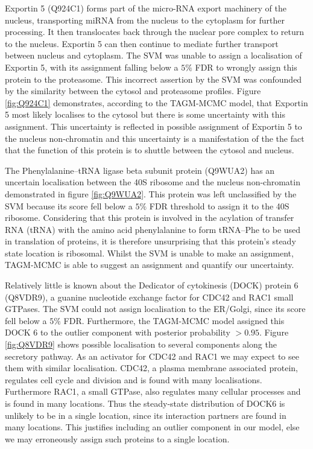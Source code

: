 \documentclass[12pt,english]{article}\usepackage[]{graphicx}\usepackage[]{color}
\begin{document}
\bigskip

Exportin 5 (Q924C1) forms part of the micro-RNA export machinery of
the nucleus, transporting miRNA from the nucleus to the cytoplasm for
further processing.  It then translocates back through the nuclear
pore complex to return to the nucleus.  Exportin 5 can then continue
to mediate further transport between nucleus and cytoplasm.  The SVM
was unable to assign a localisation of Exportin 5, with its assignment
falling below a $5\%$ FDR to wrongly assign this protein to the
proteasome. This incorrect assertion by the SVM was confounded by the
similarity between the cytosol and proteasome profiles.  Figure
\ref{fig:Q924C1} demonstrates, according to the TAGM-MCMC model, that
Exportin 5 most likely localises to the cytosol but there is some
uncertainty with this assignment.  This uncertainty is reflected in
possible assignment of Exportin 5 to the nucleus non-chromatin and
this uncertainty is a manifestation of the the fact that the function
of this protein is to shuttle between the cytosol and nucleus.

The Phenylalanine--tRNA ligase beta subunit protein (Q9WUA2) has an
uncertain localisation between the 40S ribosome and the nucleus
non-chromatin demonstrated in figure \ref{fig:Q9WUA2}. This protein
was left unclassified by the SVM because its score fell below a $5\%$
FDR threshold to assign it to the 40S ribosome. Considering that this
protein is involved in the acylation of transfer RNA (tRNA) with the
amino acid phenylalanine to form tRNA--Phe to be used in translation of
proteins, it is therefore unsurprising that this protein's steady
state location is ribosomal.  Whilst the SVM is unable to make an
assignment, TAGM-MCMC is able to suggest an assignment and quantify our
uncertainty.

Relatively little is known about the Dedicator of cytokinesis (DOCK)
protein 6 (Q8VDR9), a guanine nucleotide exchange factor for CDC42 and
RAC1 small GTPases. The SVM could not assign localisation to the
ER/Golgi, since its score fell below a $5\%$ FDR. Furthermore, the
TAGM-MCMC model assigned this DOCK 6 to the outlier component with
posterior probability $>0.95$.  Figure \ref{fig:Q8VDR9} shows possible
localisation to several components along the secretory pathway. As an
activator for CDC42 and RAC1 we may expect to see them with similar
localisation. CDC42, a plasma membrane associated protein, regulates
cell cycle and division and is found with many
localisations. Furthermore RAC1, a small GTPase, also regulates many
cellular processes and is found in many locations. Thus the
steady-state distribution of DOCK6 is unlikely to be in a single
location, since its interaction partners are found in many
locations. This justifies including an outlier component in our model,
else we may erroneously assign such proteins to a single location.
\end{document}
